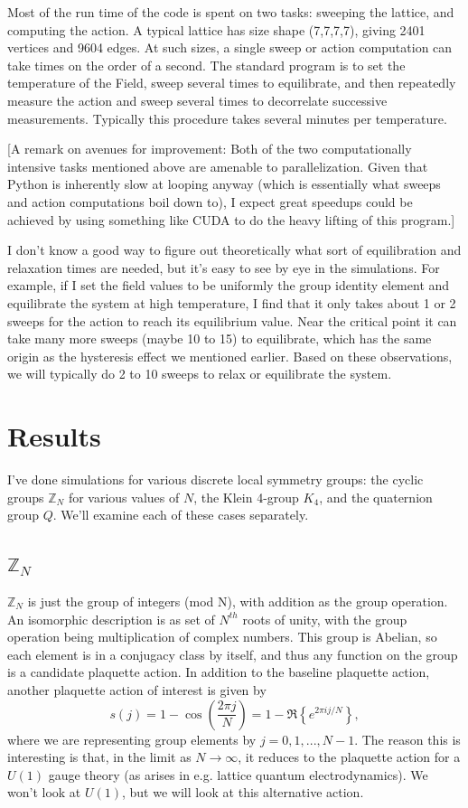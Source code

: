 \documentclass[9pt,twocolumn,twoside]{article}
\begin{document}
Most of the run time of the code is spent on two tasks: sweeping the lattice, and computing the action.  A typical lattice has size shape (7,7,7,7), giving 2401 vertices and 9604 edges.  At such sizes, a single sweep or action computation can take times on the order of a second.  The standard program is to set the temperature of the Field, sweep several times to equilibrate, and then repeatedly measure the action and sweep several times to decorrelate successive measurements.  Typically this procedure takes several minutes per temperature.

[A remark on avenues for improvement: Both of the two computationally intensive tasks mentioned above are amenable to parallelization.  Given that Python is inherently slow at looping anyway (which is essentially what sweeps and action computations boil down to), I expect great speedups could be achieved by using something like CUDA to do the heavy lifting of this program.]

I don't know a good way to figure out theoretically what sort of equilibration and relaxation times are needed, but it's easy to see by eye in the simulations.  For example, if I set the field values to be uniformly the group identity element and equilibrate the system at high temperature, I find that it only takes about 1 or 2 sweeps for the action to reach its equilibrium value.  Near the critical point it can take many more sweeps (maybe 10 to 15) to equilibrate, which has the same origin as the hysteresis effect we mentioned earlier.  Based on these observations, we will typically do 2 to 10 sweeps to relax or equilibrate the system.  

\section{Results}
I've done simulations for various discrete local symmetry groups: the cyclic groups $\mathbb{Z}_N$ for various values of $N$, the Klein 4-group $K_4$, and the quaternion group $Q$.  We'll examine each of these cases separately.

\subsection{$\mathbb{Z}_N$}
$\mathbb{Z}_N$ is just the group of integers (mod N), with addition as the group operation.  An isomorphic description is as set of $N^{th}$ roots of unity, with the group operation being multiplication of complex numbers.  This group is Abelian, so each element is in a conjugacy class by itself, and thus any function on the group is a candidate plaquette action.  In addition to the baseline plaquette action, another plaquette action of interest is given by 
\[s(j) = 1-\cos\left(\frac{2\pi j}{N}\right) = 1 - \Re{\left\{ e^{2\pi i j/N} \right\}},\]
where we are representing group elements by $j=0,1,...,N-1$.  The reason this is interesting is that, in the limit as $N\rightarrow \infty$, it reduces to the plaquette action for a $U(1)$ gauge theory (as arises in e.g. lattice quantum electrodynamics).  We won't look at $U(1)$, but we will look at this alternative action. 
\end{document}
